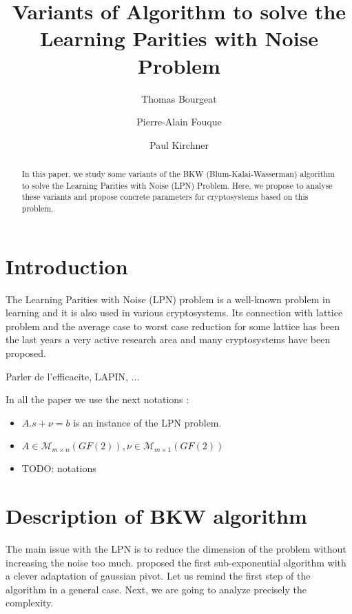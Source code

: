 \documentclass{llncs}		%
\begin{document}
\title{Variants of Algorithm to solve the Learning Parities with Noise Problem}
\author{Thomas Bourgeat \and Pierre-Alain Fouque \and Paul Kirchner}

\maketitle

\begin{abstract}
In this paper, we study some variants of the BKW (Blum-Kalai-Wasserman) algorithm to solve the Learning Parities with Noise (LPN) Problem. Here, we propose to analyse these variants and propose concrete parameters for cryptosystems based on this problem. 
\end{abstract}

\section{Introduction}
The Learning Parities with Noise (LPN) problem is 
a well-known problem in learning and it is also used 
in various cryptosystems. 
Its connection with lattice problem and the average case to worst
 case reduction for some lattice has been the last years
 a very active research area and many cryptosystems have been proposed. 

Parler de l'efficacite, LAPIN, ... 

In all the paper we use the next notations :
\begin{itemize}
\item $A.s+\nu = b$ is an instance of the LPN problem.
\item $A\in \mathcal{M}_{m\times n}(GF(2)), \nu\in \mathcal{M}_{m\times
1}(GF(2))$
\item TODO: notations
\end{itemize}

\section{Description of BKW algorithm}
The main issue with the LPN is to reduce the dimension of the problem without
increasing the noise too much. \cite{BKW} proposed the first sub-exponential
algorithm with a clever adaptation of gaussian pivot. Let us remind the first
step of the algorithm in a general case. Next, we are going to analyze precisely
the complexity.
\end{document}
